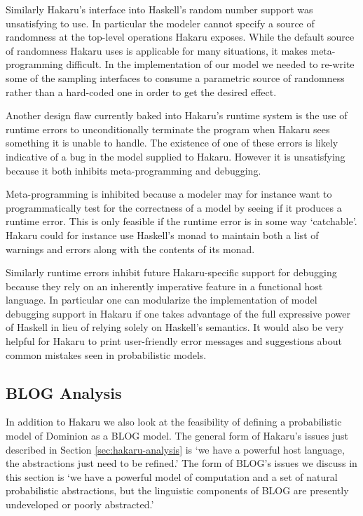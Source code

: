 Similarly Hakaru's interface into Haskell's random number support was
unsatisfying to use. In particular the modeler cannot specify a source
of randomness at the top-level operations Hakaru exposes. While the
default source of randomness Hakaru uses is applicable for many situations,
it makes meta-programming difficult. In the implementation of our model
we needed to re-write some of the sampling interfaces to consume a parametric
source of randomness rather than a hard-coded one in order to get the
desired effect.

Another design flaw currently baked into Hakaru's runtime system is the
use of runtime errors to unconditionally terminate the program when
Hakaru sees something it is unable to handle. The existence of
one of these errors is likely indicative of a bug in the model supplied
to Hakaru. However it is unsatisfying because it both inhibits
meta-programming and debugging.

Meta-programming is inhibited because a modeler may for instance want to
programmatically test for the correctness of a model by seeing if it
produces a runtime error. This is only feasible if the runtime error
is in some way `catchable'. Hakaru could for instance use Haskell's
 monad to maintain both a list of warnings and errors
along with the contents of its  monad.

Similarly runtime errors inhibit future Hakaru-specific support for
debugging because they rely on an inherently imperative feature in a
functional host language. In particular one can modularize the implementation
of model debugging support in Hakaru if one takes advantage of the full
expressive power of Haskell in lieu of relying solely on Haskell's 
semantics. It would also be very helpful for Hakaru to print user-friendly
error messages and suggestions about common mistakes seen in probabilistic
models.

\subsection{BLOG Analysis} \label{sec:blog-analysis}

In addition to Hakaru we also look at the feasibility of defining a
probabilistic model of Dominion as a BLOG model. The general form
of Hakaru's issues just described in Section \ref{sec:hakaru-analysis}
is `we have a powerful host language, the abstractions
just need to be refined.' The form of BLOG's issues we discuss in this
section is `we have a powerful model of computation and a set of
natural probabilistic abstractions, but the linguistic components
of BLOG are presently undeveloped or poorly abstracted.'

